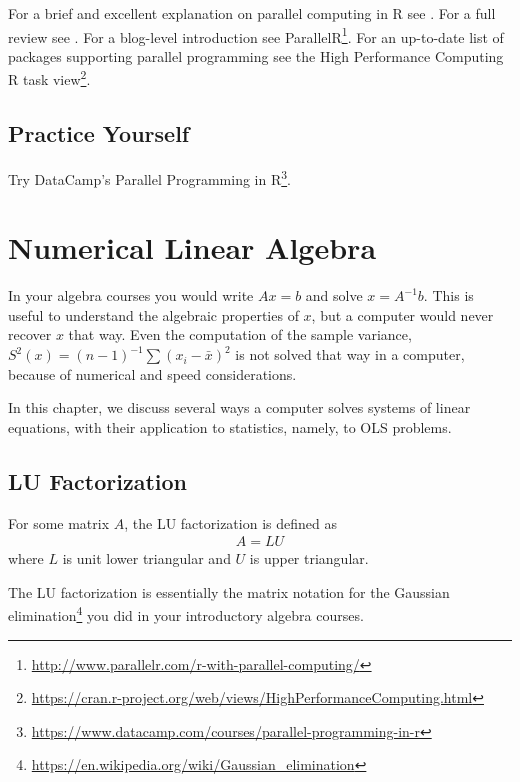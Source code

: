 \documentclass[]{book}
\renewcommand{\href}[2]{#2\footnote{\url{#1}}}
\theoremstyle{definition}
\theoremstyle{definition}
\theoremstyle{definition}
\theoremstyle{remark}
\let\BeginKnitrBlock\begin \let\EndKnitrBlock\end
\begin{document}
For a brief and excellent explanation on parallel computing in R see \citet{schmidberger2009state}.
For a full review see \citet{chapple2016mastering}.
For a blog-level introduction see \href{http://www.parallelr.com/r-with-parallel-computing/}{ParallelR}.
For an up-to-date list of packages supporting parallel programming see the High Performance Computing \href{https://cran.r-project.org/web/views/HighPerformanceComputing.html}{R task view}.

\hypertarget{practice-yourself-12}{%
\section{Practice Yourself}\label{practice-yourself-12}}

Try DataCamp's \href{https://www.datacamp.com/courses/parallel-programming-in-r}{Parallel Programming in R}.

\hypertarget{algebra}{%
\chapter{Numerical Linear Algebra}\label{algebra}}

In your algebra courses you would write \(Ax=b\) and solve \(x=A^{-1}b\).
This is useful to understand the algebraic properties of \(x\), but a computer would never recover \(x\) that way.
Even the computation of the sample variance, \(S^2(x)=(n-1)^{-1}\sum (x_i-\bar x )^2\) is not solved that way in a computer, because of numerical and speed considerations.

In this chapter, we discuss several ways a computer solves systems of linear equations, with their application to statistics, namely, to OLS problems.

\hypertarget{lu-factorization}{%
\section{LU Factorization}\label{lu-factorization}}

\BeginKnitrBlock{definition}[LU Factorization]
\protect\hypertarget{def:lu}{}{\label{def:lu} {} }For some matrix \(A\), the LU factorization is defined as
\begin{align}
 A = L U 
\end{align}
where \(L\) is unit lower triangular and \(U\) is upper triangular.
\EndKnitrBlock{definition}

The LU factorization is essentially the matrix notation for the \href{https://en.wikipedia.org/wiki/Gaussian_elimination}{Gaussian elimination} you did in your introductory algebra courses.
\end{document}
